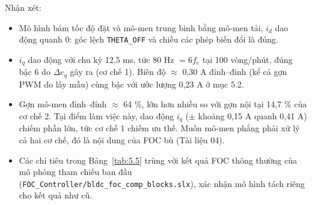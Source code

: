Nhận xét:

\begin{itemize}[leftmargin=*]
\item Mô hình bám tốc độ đặt và mô-men trung bình bằng mô-men tải, $i_d$ dao động quanh 0: góc lệch \texttt{THETA\_OFF} và chiều các phép biến đổi là đúng.
\item $i_q$ dao động với chu kỳ 12,5 ms, tức 80 Hz $= 6 f_e$ tại 100 vòng/phút, đúng bậc 6 do $\Delta e_q$ gây ra (cơ chế 1). Biên độ $\approx$ 0,30 A đỉnh–đỉnh (kể cả gợn PWM do lấy mẫu) cùng bậc với ước lượng 0,23 A ở mục 5.2.
\item Gợn mô-men đỉnh–đỉnh $\approx$ 64 \%, lớn hơn nhiều so với gợn nội tại 14,7 \% của cơ chế 2. Tại điểm làm việc này, dao động $i_q$ ($\pm$ khoảng 0,15 A quanh 0,41 A) chiếm phần lớn, tức cơ chế 1 chiếm ưu thế. Muốn mô-men phẳng phải xử lý cả hai cơ chế, đó là nội dung của FOC bù (Tài liệu 04).
\item Các chỉ tiêu trong Bảng~\ref{tab:5.5} trùng với kết quả FOC thông thường của mô phỏng tham chiếu ban đầu (\texttt{FOC\_Controller/bldc\_foc\_comp\_blocks.slx}), xác nhận mô hình tách riêng cho kết quả như cũ.
\end{itemize}

